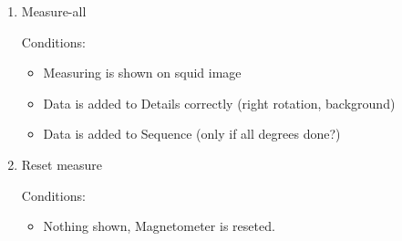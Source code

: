 \begin{enumerate}
\item Measure-all

Conditions:
\begin{itemize}
\item Measuring is shown on squid image
\item Data is added to Details correctly (right rotation, background)
\item Data is added to Sequence (only if all degrees done?)
\end{itemize}

\item Reset measure

Conditions:
\begin{itemize}
\item Nothing shown, Magnetometer is reseted.
\end{itemize}

\end{enumerate}